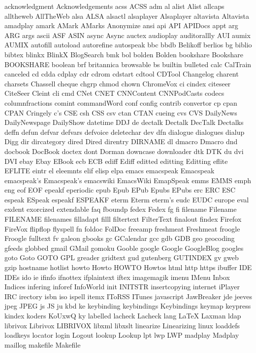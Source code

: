 acknowledgment
Acknowledgements
acss
ACSS
adm
al
alist
Alist
allcaps
alltheweb
AllTheWeb
alsa
ALSA
alsactl
alsaplayer
Alsaplayer
altavista
Altavista
amadplay
amark
AMark
AMarks
Anonymize
ansi
api
API
APIDocs
appt
arg
ARG
args
ascii
ASF
ASIN
async
Async
auctex
audioplay
auditorallly
AUI
aumix
AUMIX
autofill
autoload
autorefine
autospeak
bbc
bbdb
Belikoff
berlios
bg
biblio
bibtex
blinkx
BlinkX
BlogSearch
bmk
bol
bolden
Bolden
bookshare
Bookshare
BOOKSHARE
boolean
brf
britannica
browsable
bs
builtin
bulleted
calc
CalTrain
canceled
cd
cdda
cdplay
cdr
cdrom
cdstart
cdtool
CDTool
Changelog
charent
charsets
Chassell
cheque
chgrp
chmod
chown
ChromeVox
ci
cindex
citeseer
CiteSeer
Cleint
cli
cmd
CNet
CNET
CNNContent
CNNPodCasts
codecs
columnfractions
comint
commandWord
conf
config
contrib
convertor
cp
cpan
CPAN
Cringely
c's
CSE
csh
CSS
csv
ctan
CTAN
cueing
cvs
CVS
DailyNews
DailyNewspage
DailyShow
datetime
DDJ
de
dectalk
Dectalk
DecTalk
Dectalks
deffn
defun
defvar
defvars
defvoice
deletechar
dev
dfn
dialogue
dialogues
dialup
Digg
dir
dircategory
dired
Dired
direntry
DIRNAME
dl
dmacro
Dmacro
dnd
docbook
DocBook
doctex
dont
Dorman
downcase
downloader
dtk
DTK
du
dvi
DVI
ebay
Ebay
EBook
ecb
ECB
ediff
Ediff
editted
editting
Editting
eflite
EFLITE
eintr
el
eleemnts
elif
elisp
elpa
emacs
emacspeak
Emacspeak
emacspeak's
Emacspeak's
emacswiki
EmacsWiki
EmapSpeak
emms
EMMS
emph
eng
eof
EOF
epeakf
eperiodic
epub
Epub
EPub
Epubs
EPubs
erc
ERC
ESC
espeak
ESpeak
espeakf
ESPEAKF
eterm
Eterm
eterm's
eudc
EUDC
europe
eval
exdent
exorcized
extendable
faq
fboundp
fedex
Fedex
fg
fi
filename
Filename
FILENAME
filenames
filladapt
filll
filtertext
FilterText
finalout
findex
Firefox
FireVox
flipflop
flyspell
fn
foldoc
FolDoc
freeamp
freshmeat
Freshmeat
froogle
Froogle
fulltext
fv
galeon
gbooks
gc
GCalendar
gcc
gdb
GDB
geo
geocoding
gfeeds
globbed
gmail
GMail
gomoku
Gooble
google
Google
GoogleBlog
googles
goto
Goto
GOTO
GPL
greader
gridtext
gud
gutenberg
GUTINDEX
gv
gweb
gzip
hostname
hotlist
howto
Howto
HOWTO
Howtos
html
http
https
ibuffer
IDE
IDEs
ido
ie
ifinfo
ifnottex
ifplaintext
iftex
imagemagik
imenu
IMenu
Inbox
Indices
infering
inforef
InfoWorld
init
INITSTR
insertcopying
internet
iPlayer
IRC
irectory
isbn
iso
ispell
itemx
IToRSS
ITunes
javascript
JawBreaker
jde
jeeves
jpeg
JPEG
js
JS
ju
kbd
ke
keybinding
keybindings
Keybindings
keymap
keypress
kindex
koders
KoUxwQ
ky
labelled
lacheck
Lacheck
lang
LaTeX
Laxman
ldap
librivox
Librivox
LIBRIVOX
libxml
libxslt
linearize
Linearizing
linux
loaddefs
loadkeys
locator
login
Logout
lookup
Lookup
lpt
lwp
LWP
madplay
Madplay
maillog
makefile
Makefile
